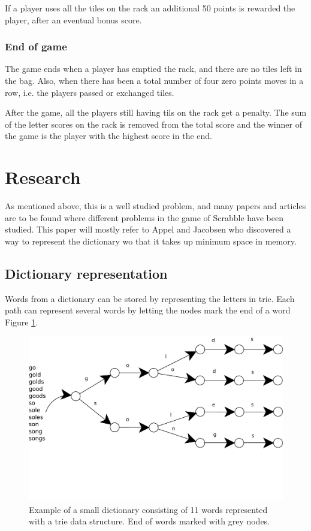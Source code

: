 \documentclass[a4paper, 12pt]{report}
\begin{document}
If a player uses all the tiles on the rack an additional 50 points is rewarded the player, after an eventual bonus score.

\subsubsection{End of game}
The game ends when a player has emptied the rack, and there are no tiles left in the bag. Also, when there has been a total number of four zero points moves in a row, i.e. the players passed or exchanged tiles.

After the game, all the players still having tils on the rack get a penalty. The sum of the letter scores on the rack is removed from the total score and the winner of the game is the player with the highest score in the end.

\section{Research}
As mentioned above, this is a well studied problem, and many papers and articles are to be found where different problems in the game of Scrabble have been studied. This paper will mostly refer to Appel and Jacobsen \cite{fastest} who discovered a way to represent the dictionary wo that it takes up minimum space in memory.

\subsection{Dictionary representation}
Words from a dictionary can be stored by representing the letters in trie. Each path can represent several words by letting the nodes mark the end of a word Figure \ref{fig:trie}. 

\begin{figure}[h]
\centering
\includegraphics[scale=1]{trie}
\caption{Example of a small dictionary consisting of 11 words represented with a trie data structure. End of words marked with grey nodes.}
\label{fig:trie}
\end{figure}
\end{document}
